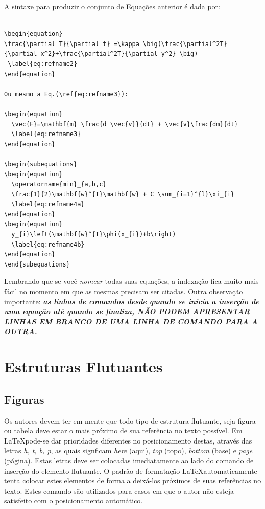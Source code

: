 \documentclass[12pt,A4,A4pt]{article}
\begin{document}
A sintaxe para produzir o conjunto de Equações anterior é dada por:

\begin{verbatim}

\begin{equation}
\frac{\partial T}{\partial t} =\kappa \big(\frac{\partial^2T}
{\partial x^2}+\frac{\partial^2T}{\partial y^2} \big) 
 \label{eq:refname2}
\end{equation}

Ou mesmo a Eq.(\ref{eq:refname3}):

\begin{equation}
  \vec{F}=\mathbf{m} \frac{d \vec{v}}{dt} + \vec{v}\frac{dm}{dt} 
  \label{eq:refname3}
\end{equation}

\begin{subequations}
\begin{equation}
  \operatorname{min}_{a,b,c} 
  \frac{1}{2}\mathbf{w}^{T}\mathbf{w} + C \sum_{i=1}^{l}\xi_{i}
  \label{eq:refname4a}
\end{equation}    
\begin{equation}
  y_{i}\left(\mathbf{w}^{T}\phi(x_{i})+b\right)
  \label{eq:refname4b}
\end{equation}
\end{subequations}

\end{verbatim}

Lembrando que se você \emph{nomear} todas suas equações, a indexação fica muito mais fácil no momento em que as mesmas precisam ser citadas.
Outra observação importante: \textit{\textbf{as linhas de comandos desde quando se inicia a inserção de uma equação até quando se finaliza, NÃO PODEM APRESENTAR LINHAS EM BRANCO DE UMA LINHA DE COMANDO PARA A OUTRA.}}

\section{Estruturas Flutuantes}
\subsection{Figuras}
Os autores devem ter em mente que todo tipo de estrutura flutuante, seja figura ou tabela deve estar o mais próximo de sua referência no texto possível. Em \LaTeX pode-se dar prioridades diferentes no posicionamento destas, através das letras \textit{h, t, b, p}, as quais signficam \textit{here} (aqui), \textit{top} (topo), \textit{bottom} (base) e \textit{page} (página). Estas letras deve ser colocadas imediatamente ao lado do comando de inserção do elemento flutuante. O padrão de formatação \LaTeX automaticamente tenta colocar estes elementos de forma a deixá-los próximos de suas referências no texto. Estes comando são utilizados para casos em que o autor não esteja satisfeito com o posicionamento automático.
\end{document}

